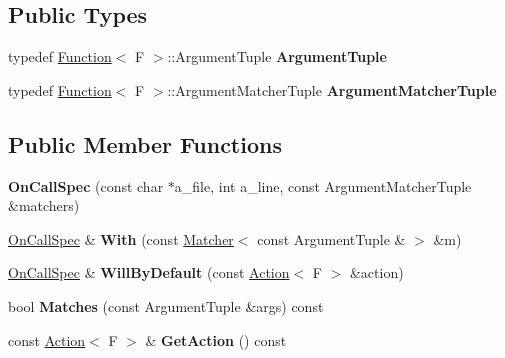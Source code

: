 \subsection*{Public Types}
\begin{DoxyCompactItemize}
\item 
typedef \hyperlink{structtesting_1_1internal_1_1Function}{Function}$<$ F $>$\+::Argument\+Tuple {\bfseries Argument\+Tuple}\hypertarget{classtesting_1_1internal_1_1OnCallSpec_a70ffab8b915b7b48a90f5ce256da806f}{}\label{classtesting_1_1internal_1_1OnCallSpec_a70ffab8b915b7b48a90f5ce256da806f}

\item 
typedef \hyperlink{structtesting_1_1internal_1_1Function}{Function}$<$ F $>$\+::Argument\+Matcher\+Tuple {\bfseries Argument\+Matcher\+Tuple}\hypertarget{classtesting_1_1internal_1_1OnCallSpec_a3240f159f0a9d8cda208bc256da35074}{}\label{classtesting_1_1internal_1_1OnCallSpec_a3240f159f0a9d8cda208bc256da35074}

\end{DoxyCompactItemize}
\subsection*{Public Member Functions}
\begin{DoxyCompactItemize}
\item 
{\bfseries On\+Call\+Spec} (const char $\ast$a\+\_\+file, int a\+\_\+line, const Argument\+Matcher\+Tuple \&matchers)\hypertarget{classtesting_1_1internal_1_1OnCallSpec_ac7077e8162a10714e463b64a3cc7d054}{}\label{classtesting_1_1internal_1_1OnCallSpec_ac7077e8162a10714e463b64a3cc7d054}

\item 
\hyperlink{classtesting_1_1internal_1_1OnCallSpec}{On\+Call\+Spec} \& {\bfseries With} (const \hyperlink{classtesting_1_1Matcher}{Matcher}$<$ const Argument\+Tuple \& $>$ \&m)\hypertarget{classtesting_1_1internal_1_1OnCallSpec_a2421cc9ac5c954a3a4c9275c35771bad}{}\label{classtesting_1_1internal_1_1OnCallSpec_a2421cc9ac5c954a3a4c9275c35771bad}

\item 
\hyperlink{classtesting_1_1internal_1_1OnCallSpec}{On\+Call\+Spec} \& {\bfseries Will\+By\+Default} (const \hyperlink{classtesting_1_1Action}{Action}$<$ F $>$ \&action)\hypertarget{classtesting_1_1internal_1_1OnCallSpec_a1c6303bf46983f20f4d2a61752fa8663}{}\label{classtesting_1_1internal_1_1OnCallSpec_a1c6303bf46983f20f4d2a61752fa8663}

\item 
bool {\bfseries Matches} (const Argument\+Tuple \&args) const \hypertarget{classtesting_1_1internal_1_1OnCallSpec_a98603357e18be6450cd2154853bea3f7}{}\label{classtesting_1_1internal_1_1OnCallSpec_a98603357e18be6450cd2154853bea3f7}

\item 
const \hyperlink{classtesting_1_1Action}{Action}$<$ F $>$ \& {\bfseries Get\+Action} () const \hypertarget{classtesting_1_1internal_1_1OnCallSpec_ad560cd3f669be59d1159a962c76ba9b7}{}\label{classtesting_1_1internal_1_1OnCallSpec_ad560cd3f669be59d1159a962c76ba9b7}

\end{DoxyCompactItemize}
